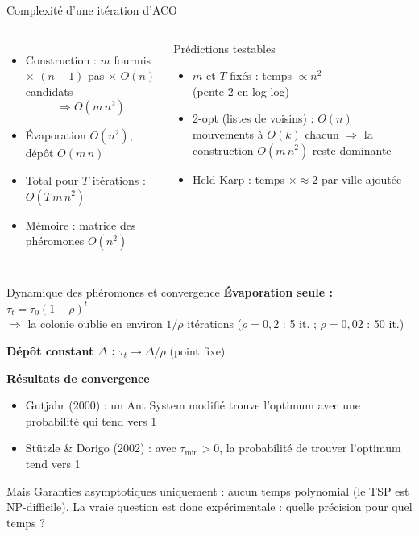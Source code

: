 \documentclass[aspectratio=169,11pt]{beamer}
\begin{document}
\begin{frame}{Complexité d'une itération d'ACO}
  \begin{columns}[T]
    \begin{itemize}
      \item Construction : $m$ fourmis $\times$ $(n-1)$ pas $\times$ $O(n)$ candidats
            \[ \Rightarrow O(m\,n^2) \]
      \item Évaporation $O(n^2)$, dépôt $O(m\,n)$
      \item Total pour $T$ itérations : $\boxed{O(T\,m\,n^2)}$
      \item Mémoire : matrice des phéromones $O(n^2)$
    \end{itemize}
    \begin{block}{Prédictions testables}
      \begin{itemize}
        \item $m$ et $T$ fixés : temps $\propto n^2$ \\ (pente 2 en log-log)
        \item 2-opt (listes de voisins) : $O(n)$ mouvements à $O(k)$ chacun $\Rightarrow$ la
              construction $O(m\,n^2)$ reste dominante
        \item Held-Karp : temps $\times \approx 2$ par ville ajoutée
      \end{itemize}
    \end{block}
  \end{columns}
\end{frame}

\begin{frame}{Dynamique des phéromones et convergence}
  \textbf{Évaporation seule :} $\tau_t = \tau_0 (1-\rho)^t$ \\
  \quad $\Rightarrow$ la colonie \og oublie\fg{} en environ $1/\rho$ itérations
  \quad ($\rho = 0{,}2$ : 5 it. ; $\rho = 0{,}02$ : 50 it.)

  \smallskip
  \textbf{Dépôt constant $\Delta$ :} $\tau_t \to \Delta / \rho$ (point fixe)

  \smallskip
  \textbf{Résultats de convergence}
  \begin{itemize}\small
    \item Gutjahr (2000) : un Ant System modifié trouve l'optimum avec une probabilité qui tend vers 1
    \item Stützle \& Dorigo (2002) : avec $\tau_{\min} > 0$, la probabilité de trouver l'optimum tend vers 1
  \end{itemize}

  \begin{alertblock}{Mais}
    Garanties \alert{asymptotiques} uniquement : aucun temps polynomial (le TSP est NP-difficile).
    La vraie question est donc expérimentale : \alert{quelle précision pour quel temps ?}
  \end{alertblock}
\end{frame}
\end{document}
